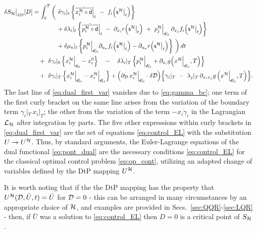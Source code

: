 \documentclass[11pt]{article}
\begin{document}
    \begin{align}
         \delta S_\sch\big|_{\delta D}[D] & = \int_0^T \bigg( \ \delta \gamma_i|_t \, \bigg\{ \dot{\overline{x^\sch_i \circ \mathsf{d}}}\Big|_t \ - \ f_i \Big( \mathsf{s}^\sch \big|_t \Big) \bigg\} \notag \\
        & \qquad \qquad + \delta \lambda_i|_t \, \bigg\{ \dot{\overline{p^\sch_i \circ \mathsf{d}}}\Big|_t  \ - \ \p_{x_i} r \Big( \mathsf{s}^\sch \big|_t \Big) \ + \ p^\sch_j\Big|_{ \mathsf{d}|_t} \, \p_{x_j} f_i \Big( \mathsf{s}^\sch \big|_t \Big) \bigg\} \notag\\
        & \qquad \qquad + \delta \mu_\kappa|_t \, \bigg\{ p^\sch_i \Big|_{ \mathsf{d}|_t}  \p_{u_\kappa} f_i \Big( \mathsf{s}^\sch \big|_t \Big) -  \p_{u_\kappa} r \Big(  \mathsf{s}^\sch \big|_t\Big)\bigg\}      \ \bigg) \, dt \label{eq:dual_first_var}\\
        & \quad + \ \delta \gamma_i|_0 \, \Big\{  x^\sch_i \Big|_{\mathsf{d}_0} - x_i^0 \Big\} \quad - \quad \delta \lambda_i|_T \, \Big\{ p^\sch_i\Big|_{ \mathsf{d}|_t}  + \p_{x_i} g \Big( x^\sch \Big|_{ \mathsf{d}|_t}, T \Big) \Big\} \notag\\
        & \quad + \ \delta \gamma_i|_T \, \Big\{  x^\sch_i \Big|_{ \mathsf{d}|_t} - x^\sch_i \Big|_{ \mathsf{d}|_t} \Big\} + \Big( \p_\dee \, x^\sch_i\Big|_{ \mathsf{d}|_t} \cdot \delta \dee \Big) \Big\{ \gamma_i|_T \ - \ \lambda_j|_T \, \p_{x_i x_j} g \, \Big( x^\sch \Big|_{ \mathsf{d}|_t} , T \Big) \Big\}. \notag
    \end{align}
\endgroup
The last line of \eqref{eq:dual_first_var} vanishes due to \eqref{eq:gamma_bc}; one term of the first curly bracket on the same line arises from the variation of the boundary term $\gamma_i|_T \, x_i|_T $; the other from the variation of the term $- x_i \dot{\gamma}_i$ in the Lagrangian $\mathcal{L}_{\mathcal{H}}$ after integration by parts. The five other expressions within curly brackets in \eqref{eq:dual_first_var} are the set of equations \eqref{eq:control_EL} with the substitution $U \to U^{\mathcal{H}}$. Thus, by standard arguments, the Euler-Lagrange equations of the dual functional \eqref{eq:pont_dual} are the necessary conditions \eqref{eq:control_EL} for the classical optimal control problem \eqref{eq:op_cont}, utilizing an adapted change of variables defined by the DtP mapping $U^{\mathcal{H}}$.

It is worth noting that if the the DtP mapping has the property that $U^{\mathcal{H}} (\mathcal{D},\bar{U},t) = \bar{U}$ for $\mathcal{D} = 0$ - this can be arranged in many circumstances by an appropriate choice of $\mathcal{H}$, and examples are provided in Secs.~\ref{sec:QQR}-\ref{sec:LQR} - then, if $\bar{U}$ was a solution to \eqref{eq:control_EL} then $D= 0$ is a critical point of $S_{\mathcal{H}}$.
\end{document}
